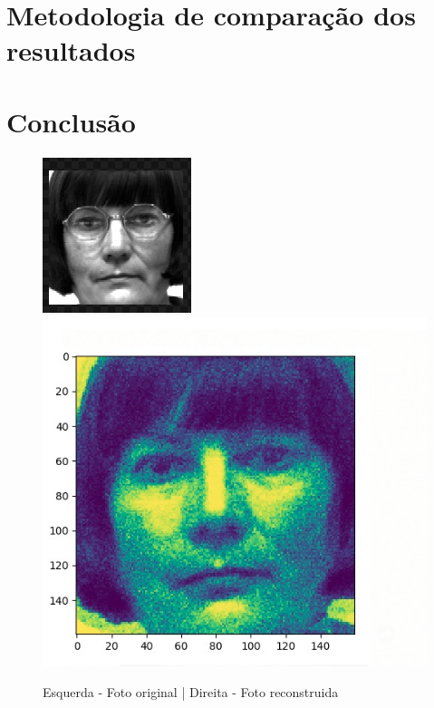 \documentclass[a4paper, 12pt]{article}
\begin{document}
\section{Metodologia de comparação dos resultados}
\section{Conclusão}

\begin{figure}[ht]
 \centering
 \includegraphics[scale=0.8]{original.png}
 \includegraphics[scale=0.33]{reconstruida.png}
 \caption{Esquerda - Foto original | Direita - Foto reconstruida }
\end{figure}


\end{document}

